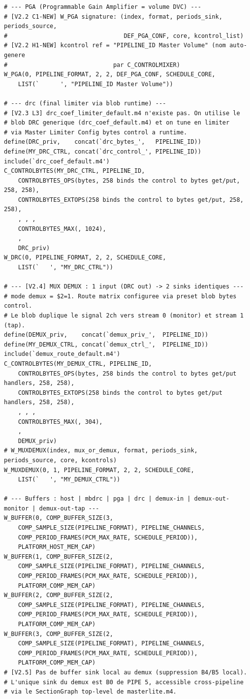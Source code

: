 \documentclass[11pt,a4paper]{article}
\begin{document}
\begin{lstlisting}[language={}, basicstyle=\ttfamily\scriptsize]
# --- PGA (Programmable Gain Amplifier = volume DVC) ---
# [V2.2 C1-NEW] W_PGA signature: (index, format, periods_sink, periods_source,
#                                 DEF_PGA_CONF, core, kcontrol_list)
# [V2.2 H1-NEW] kcontrol ref = "PIPELINE_ID Master Volume" (nom auto-genere
#                              par C_CONTROLMIXER)
W_PGA(0, PIPELINE_FORMAT, 2, 2, DEF_PGA_CONF, SCHEDULE_CORE,
    LIST(`		', "PIPELINE_ID Master Volume"))

# --- drc (final limiter via blob runtime) ---
# [V2.3 L3] drc_coef_limiter_default.m4 n'existe pas. On utilise le
# blob DRC generique (drc_coef_default.m4) et on tune en limiter
# via Master Limiter Config bytes control a runtime.
define(DRC_priv,    concat(`drc_bytes_',   PIPELINE_ID))
define(MY_DRC_CTRL, concat(`drc_control_', PIPELINE_ID))
include(`drc_coef_default.m4')
C_CONTROLBYTES(MY_DRC_CTRL, PIPELINE_ID,
    CONTROLBYTES_OPS(bytes, 258 binds the control to bytes get/put, 258, 258),
    CONTROLBYTES_EXTOPS(258 binds the control to bytes get/put, 258, 258),
    , , ,
    CONTROLBYTES_MAX(, 1024),
    ,
    DRC_priv)
W_DRC(0, PIPELINE_FORMAT, 2, 2, SCHEDULE_CORE,
    LIST(`   ', "MY_DRC_CTRL"))

# --- [V2.4] MUX DEMUX : 1 input (DRC out) -> 2 sinks identiques ---
# mode demux = $2=1. Route matrix configuree via preset blob bytes control.
# Le blob duplique le signal 2ch vers stream 0 (monitor) et stream 1 (tap).
define(DEMUX_priv,    concat(`demux_priv_',  PIPELINE_ID))
define(MY_DEMUX_CTRL, concat(`demux_ctrl_',  PIPELINE_ID))
include(`demux_route_default.m4')
C_CONTROLBYTES(MY_DEMUX_CTRL, PIPELINE_ID,
    CONTROLBYTES_OPS(bytes, 258 binds the control to bytes get/put handlers, 258, 258),
    CONTROLBYTES_EXTOPS(258 binds the control to bytes get/put handlers, 258, 258),
    , , ,
    CONTROLBYTES_MAX(, 304),
    ,
    DEMUX_priv)
# W_MUXDEMUX(index, mux_or_demux, format, periods_sink, periods_source, core, kcontrols)
W_MUXDEMUX(0, 1, PIPELINE_FORMAT, 2, 2, SCHEDULE_CORE,
    LIST(`   ', "MY_DEMUX_CTRL"))

# --- Buffers : host | mbdrc | pga | drc | demux-in | demux-out-monitor | demux-out-tap ---
W_BUFFER(0, COMP_BUFFER_SIZE(3,
    COMP_SAMPLE_SIZE(PIPELINE_FORMAT), PIPELINE_CHANNELS,
    COMP_PERIOD_FRAMES(PCM_MAX_RATE, SCHEDULE_PERIOD)),
    PLATFORM_HOST_MEM_CAP)
W_BUFFER(1, COMP_BUFFER_SIZE(2,
    COMP_SAMPLE_SIZE(PIPELINE_FORMAT), PIPELINE_CHANNELS,
    COMP_PERIOD_FRAMES(PCM_MAX_RATE, SCHEDULE_PERIOD)),
    PLATFORM_COMP_MEM_CAP)
W_BUFFER(2, COMP_BUFFER_SIZE(2,
    COMP_SAMPLE_SIZE(PIPELINE_FORMAT), PIPELINE_CHANNELS,
    COMP_PERIOD_FRAMES(PCM_MAX_RATE, SCHEDULE_PERIOD)),
    PLATFORM_COMP_MEM_CAP)
W_BUFFER(3, COMP_BUFFER_SIZE(2,
    COMP_SAMPLE_SIZE(PIPELINE_FORMAT), PIPELINE_CHANNELS,
    COMP_PERIOD_FRAMES(PCM_MAX_RATE, SCHEDULE_PERIOD)),
    PLATFORM_COMP_MEM_CAP)
# [V2.5] Pas de buffer sink local au demux (suppression B4/B5 local).
# L'unique sink du demux est B0 de PIPE 5, accessible cross-pipeline
# via le SectionGraph top-level de masterlite.m4.


\end{lstlisting}
\end{document}
